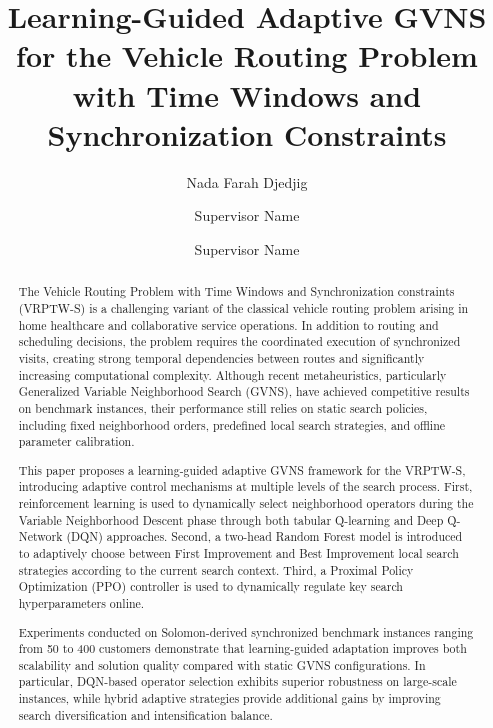 \documentclass[preprint,12pt]{elsarticle}
\begin{document}
\begin{frontmatter}

\title{ Learning-Guided Adaptive GVNS for the Vehicle Routing Problem with Time Windows and Synchronization Constraints }

\author[1]{Nada Farah Djedjig}

\author[1]{Supervisor Name}

\author[1]{Supervisor Name}

\address[1]{Department of Computer Science, University Name, City, Country}

\begin{abstract}
\noindent
The Vehicle Routing Problem with Time Windows and Synchronization constraints (VRPTW-S) is a challenging variant of the classical vehicle routing problem arising in home healthcare and collaborative service operations. In addition to routing and scheduling decisions, the problem requires the coordinated execution of synchronized visits, creating strong temporal dependencies between routes and significantly increasing computational complexity. Although recent metaheuristics, particularly Generalized Variable Neighborhood Search (GVNS), have achieved competitive results on benchmark instances, their performance still relies on static search policies, including fixed neighborhood orders, predefined local search strategies, and offline parameter calibration.

This paper proposes a learning-guided adaptive GVNS framework for the VRPTW-S, introducing adaptive control mechanisms at multiple levels of the search process. First, reinforcement learning is used to dynamically select neighborhood operators during the Variable Neighborhood Descent phase through both tabular Q-learning and Deep Q-Network (DQN) approaches. Second, a two-head Random Forest model is introduced to adaptively choose between First Improvement and Best Improvement local search strategies according to the current search context. Third, a Proximal Policy Optimization (PPO) controller is used to dynamically regulate key search hyperparameters online.

Experiments conducted on Solomon-derived synchronized benchmark instances ranging from 50 to 400 customers demonstrate that learning-guided adaptation improves both scalability and solution quality compared with static GVNS configurations. In particular, DQN-based operator selection exhibits superior robustness on large-scale instances, while hybrid adaptive strategies provide additional gains by improving search diversification and intensification balance.
\end{abstract}



\end{frontmatter}
\end{document}
